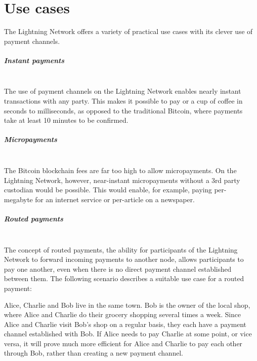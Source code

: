 \documentclass[a4paper, 12pt]{report}
\begin{document}
\chapter{Use cases}

\par The Lightning Network offers a variety of practical use cases with its clever use of payment channels.

\paragraph{Instant payments} \hspace{0pt} \\
The use of payment channels on the Lightning Network enables nearly instant transactions with any party. This makes it possible to pay or a cup of coffee in seconds to milliseconds, as opposed to the traditional Bitcoin, where payments take at least 10 minutes to be confirmed.

\paragraph{Micropayments} \hspace{0pt} \\
The Bitcoin blockchain fees are far too high to allow micropayments. On the Lightning Network, however, near-instant micropayments without a 3rd party custodian would be possible. This would enable, for example, paying per-megabyte for an internet service or per-article on a newspaper.

\paragraph{Routed payments} \hspace{0pt} \\
The concept of routed payments, the ability for participants of the Lightning Network to forward incoming payments to another node, allows participants to pay one another, even when there is no direct payment channel established between them. The following scenario describes a suitable use case for a routed payment:

\par Alice, Charlie and Bob live in the same town. Bob is the owner of the local shop, where Alice and Charlie do their grocery shopping several times a week. Since Alice and Charlie visit Bob’s shop on a regular basis, they each have a payment channel established with Bob. If Alice needs to pay Charlie at some point, or vice versa, it will prove much more efficient for Alice and Charlie to pay each other through Bob, rather than creating a new payment channel.
\end{document}
